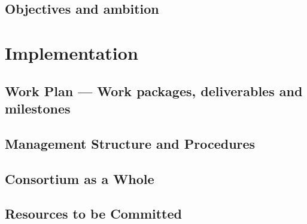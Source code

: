 \documentclass[
  deliverables,
  longtasklabels,
  noworkareas,
  svgnames,
  \classoptions
]{euproposal}       %
\begin{document}
\begin{proposal}
\subsection{Objectives and ambition}

\draftpage

\draftpage


\clearpage


\clearpage


\clearpage


\section{Implementation}

\subsection{Work Plan --- Work packages, deliverables and milestones}
\label{sect:workplan}

\newpage

\subsection{Management Structure and Procedures}


\draftpage
\subsection{Consortium as a Whole}

\draftpage

\subsection{Resources to be Committed}\label{sec:resources}



\end{proposal}
\end{document}
